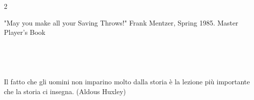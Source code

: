 \pagebreak

\thispagestyle{empty}

\setcounter{page}{1}


\setcounter{page}{1}

\begin{multicols}{2}

{\small \tableofcontents{}}

\end{multicols}

\vfill

\begin{enfasi}
"May you make all your Saving Throws!" Frank Mentzer, Spring 1985. Master Player's Book
\end{enfasi}

\pagebreak~

\thispagestyle{empty}

\pagebreak~

\setcounter{page}{1}

\begin{enfasi}
Il fatto che gli uomini non imparino molto dalla storia è la lezione più importante che la storia ci insegna. (Aldous Huxley)
\end{enfasi}

